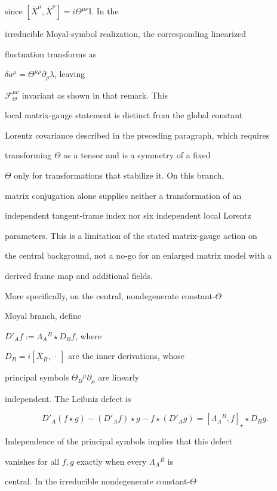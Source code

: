 since \([\bar X^\mu,\bar X^\nu]=i\Theta^{\mu\nu}\mathbb I\). In the

irreducible Moyal-symbol realization, the corresponding linearized

fluctuation transforms as

\(\delta a^\mu=\Theta^{\mu\rho}\partial_\rho\lambda\), leaving

\(\mathcal F_\Theta^{\mu\nu}\) invariant as shown in that remark. This

local matrix-gauge statement is distinct from the global constant

Lorentz covariance described in the preceding paragraph, which requires

transforming \(\Theta\) as a tensor and is a symmetry of a fixed

\(\Theta\) only for transformations that stabilize it. On this branch,

matrix conjugation alone supplies neither a transformation of an

independent tangent-frame index nor six independent local Lorentz

parameters. This is a limitation of the stated matrix-gauge action on

the central background, not a no-go for an enlarged matrix model with a

derived frame map and additional fields.



More specifically, on the central, nondegenerate constant-\(\Theta\)

Moyal branch, define

\(D'_A f:=\Lambda_A{}^B\star D_B f\), where

\(D_B=i[\bar X_B,\,\cdot\,]\) are the inner derivations, whose

principal symbols \(\Theta_B{}^\mu\partial_\mu\) are linearly

independent. The Leibniz defect is

\[

  D'_A(f\star g)-(D'_Af)\star g-f\star(D'_Ag)

  =[\Lambda_A{}^B,f]_\star\star D_Bg .

\]

Independence of the principal symbols implies that this defect

vanishes for all \(f,g\) exactly when every \(\Lambda_A{}^B\) is

central. In the irreducible nondegenerate constant-\(\Theta\)

